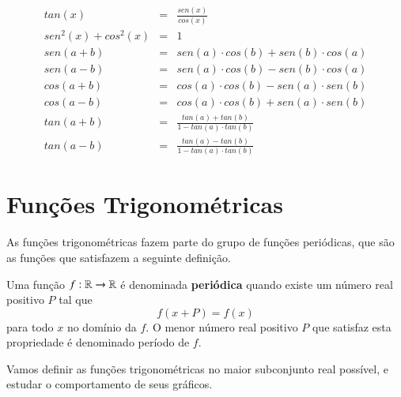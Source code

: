  \begin{eqnarray*}
  tan(x)&=&\frac{sen(x)}{cos(x)} \\
  sen^2(x) + cos^2(x)&=&1 \\
  sen(a+b)&=&sen(a)\cdot cos(b)+sen(b)\cdot cos(a) \\
  sen(a-b)&=&sen(a)\cdot cos(b)-sen(b)\cdot cos(a) \\
  cos(a+b)&=&cos(a)\cdot cos(b)-sen(a)\cdot sen(b) \\
  cos(a-b)&=&cos(a)\cdot cos(b)+sen(a)\cdot sen(b) \\
  tan(a+b)&=& \frac{tan(a)+tan(b)}{1-tan(a)\cdot tan(b)} \\
  tan(a-b)&=& \frac{tan(a)-tan(b)}{1-tan(a)\cdot tan(b)}
 \end{eqnarray*}

  
  \section{Funções Trigonométricas}

  As funções trigonométricas fazem parte do grupo de funções periódicas, que são as funções que satisfazem a seguinte definição.
  
  \begin{defi}
   Uma função $f: \mathbb{R} \rightarrow \mathbb{R}$ é denominada \textbf{periódica} quando existe um número real positivo $P$ tal que
   \[f(x + P)= f(x)\]
   para todo $x$ no domínio da $f$. O menor número real positivo $P$ que satisfaz esta propriedade é denominado período de $f$.
  \end{defi}

  Vamos definir as funções trigonométricas no maior subconjunto real possível, e estudar o comportamento de seus gráficos.


